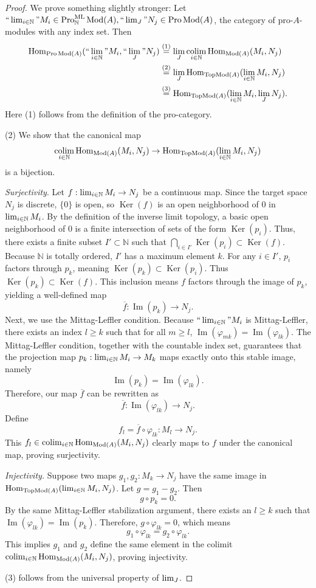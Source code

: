 \documentclass[11pt]{amsart}
\newcommand{\ra}{\rightarrow} %
\newcommand{\N}{\mathbb{N}}
\newcommand{\Hom}{\operatorname{Hom}}
\newcommand{\Ker}{\operatorname{Ker}}
\renewcommand{\Im}{\operatorname{Im}}
\newcommand{\Mod}{\operatorname{Mod}}
\newcommand{\ML}{\operatorname{ML}}
\newcommand{\TopMod}{\operatorname{TopMod}}
\renewcommand{\lim}{\operatornamewithlimits{\rm{lim}}}
\newcommand{\colim}{\operatornamewithlimits{\rm{colim}}}
\renewcommand{\phi}{{\varphi}}
\renewcommand{\bar}{\overline}
\newcommand{\Pro}{\operatorname{Pro}}
\theoremstyle{plain}
\theoremstyle{definition}
\numberwithin{equation}{prop}
\begin{document}
\begin{proof}
We prove something slightly stronger:
Let $``\lim_{i\in \N}" M_i\in \Pro^{\ML}_{\N}\Mod(A), ``\lim_J" N_j\in \Pro\Mod(A)$, the category of pro-$A$-modules with any index set. Then
\begin{align*} 
\Hom_{\Pro\Mod(A)}(``\lim_{i\in \N}" M_i,``\lim_J"N_j)
&\stackrel{(1)}{=}\lim_J \colim_{i\in \N} \Hom_{\Mod(A)}(M_i,N_j)
\\
&\stackrel{(2)}{=}\lim_J \Hom_{\TopMod(A)}(\lim_{i\in \N} M_i,N_j)\\
&\stackrel{(3)}{=}\Hom_{\TopMod(A)}(\lim_{i\in \N} M_i,\lim_J N_j).
\end{align*}
Here 
(1) follows from the definition of the pro-category.     

(2) 
We show that the canonical map 
$$\colim_{i\in \N} \Hom_{\Mod(A)}(M_i, N_j) \to \Hom_{\TopMod(A)}(\lim_{i\in \N} M_i, N_j)$$
is a bijection.

\textit{Surjectivity}.
Let $f: \lim_{i\in \N} M_i \to N_j$ be a continuous map. Since the target space $N_j$ is discrete, $\{0\}$ is open, so $\Ker(f)$ is an open neighborhood of $0$ in $\lim_{i\in \N} M_i$. 
By the definition of the inverse limit topology, a basic open neighborhood of $0$ is a finite intersection of sets of the form $\Ker(p_i)$. Thus, there exists a finite subset $I' \subset \N$ such that $\bigcap_{i \in I'} \Ker(p_i) \subset \Ker(f)$. Because $\N$ is totally ordered, $I'$ has a maximum element $k$. For any $i \in I'$, $p_i$ factors through $p_k$, meaning $\Ker(p_k) \subset \Ker(p_i)$. Thus $\Ker(p_k) \subset \Ker(f)$.
This inclusion means $f$ factors through the image of $p_k$, yielding a well-defined map 
$$\bar{f}: \Im(p_k) \to N_j.$$
Next, we use the Mittag-Leffler condition. Because $``\lim_{i\in \N}" M_i$ is Mittag-Leffler, there exists an index $l \ge k$ such that for all $m \ge l$, $\Im(\phi_{mk}) = \Im(\phi_{lk})$. 
The Mittag-Leffler condition, together with the countable index set, guarantees that the 
projection map $p_k:\lim_{i\in \N} M_i\ra M_k$ maps
exactly onto this stable image, namely 
$$\Im(p_k) = \Im(\phi_{lk}).$$
Therefore, our map $\bar{f}$ can be rewritten as
$$\bar f: \Im(\phi_{lk}) \ra N_j.$$
Define
$$f_l = \bar{f} \circ \phi_{lk}: M_l \to N_j.$$
This $f_l\in \colim_{i\in \N} \Hom_{\Mod(A)}(M_i, N_j)$ clearly maps to $f$ under the canonical map, proving surjectivity.


\textit{Injectivity.}
Suppose two maps $g_1, g_2: M_k \to N_j$ have the same image in $\Hom_{\TopMod(A)}(\lim_{i\in \N} M_i, N_j)$. Let $g = g_1 - g_2$. Then 
$$g \circ p_k = 0.$$
By the same Mittag-Leffler stabilization argument, there exists an $l \ge k$ such that $\Im(\phi_{lk}) = \Im(p_k)$. 
Therefore, $g \circ \phi_{lk} = 0$, which means 
$$g_1 \circ \phi_{lk} = g_2 \circ \phi_{lk}.$$
This implies $g_1$ and $g_2$ define the same element in the colimit $\colim_{i\in \N} \Hom_{\Mod(A)}(M_i, N_j)$, proving injectivity.

(3)
follows from the universal property of $\lim_J$.

\end{proof}
\end{document}
